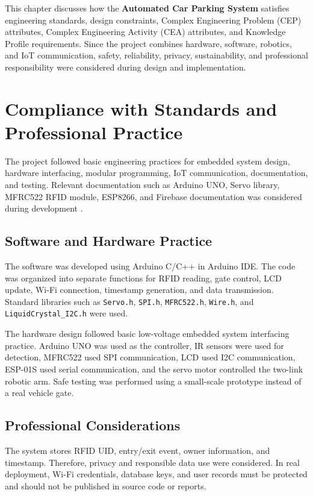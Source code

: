 
\vspace{-0.8cm}

This chapter discusses how the \textbf{Automated Car Parking System} satisfies engineering standards, design constraints, Complex Engineering Problem (CEP) attributes, Complex Engineering Activity (CEA) attributes, and Knowledge Profile requirements. Since the project combines hardware, software, robotics, and IoT communication, safety, reliability, privacy, sustainability, and professional responsibility were considered during design and implementation.

\section{Compliance with Standards and Professional Practice}

The project followed basic engineering practices for embedded system design, hardware interfacing, modular programming, IoT communication, documentation, and testing. Relevant documentation such as Arduino UNO, Servo library, MFRC522 RFID module, ESP8266, and Firebase documentation was considered during development \cite{b8,b9,b10,b11,b12}.

\subsection{Software and Hardware Practice}

The software was developed using Arduino C/C++ in Arduino IDE. The code was organized into separate functions for RFID reading, gate control, LCD update, Wi-Fi connection, timestamp generation, and data transmission. Standard libraries such as \texttt{Servo.h}, \texttt{SPI.h}, \texttt{MFRC522.h}, \texttt{Wire.h}, and \texttt{LiquidCrystal\_I2C.h} were used.

The hardware design followed basic low-voltage embedded system interfacing practice. Arduino UNO was used as the controller, IR sensors were used for detection, MFRC522 used SPI communication, LCD used I2C communication, ESP-01S used serial communication, and the servo motor controlled the two-link robotic arm. Safe testing was performed using a small-scale prototype instead of a real vehicle gate.

\subsection{Professional Considerations}

The system stores RFID UID, entry/exit event, owner information, and timestamp. Therefore, privacy and responsible data use were considered. In real deployment, Wi-Fi credentials, database keys, and user records must be protected and should not be published in source code or reports.

